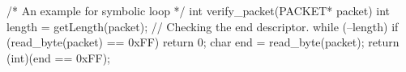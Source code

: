 /* An example for symbolic loop */
int verify_packet(PACKET* packet)
{
    int length = getLength(packet);
    // Checking the end descriptor.
    while (--length) {
        if (read_byte(packet) == 0xFF) {
             return 0;
        }
    }
    char end = read_byte(packet);
    return (int)(end == 0xFF);
}